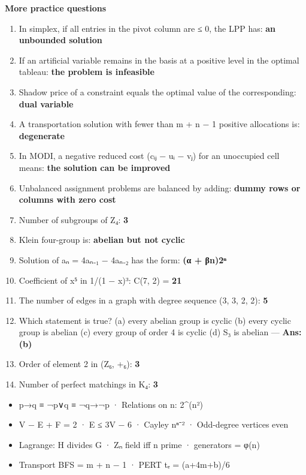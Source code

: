 \textbf{More practice questions}

\begin{enumerate}
\def\labelenumi{\arabic{enumi}.}
\setcounter{enumi}{46}
\tightlist
\item
  In simplex, if all entries in the pivot column are ≤ 0, the LPP has: \textbf{an unbounded solution}
\item
  If an artificial variable remains in the basis at a positive level in the optimal tableau: \textbf{the problem is infeasible}
\item
  Shadow price of a constraint equals the optimal value of the corresponding: \textbf{dual variable}
\item
  A transportation solution with fewer than m + n − 1 positive allocations is: \textbf{degenerate}
\item
  In MODI, a negative reduced cost (cᵢⱼ − uᵢ − vⱼ) for an unoccupied cell means: \textbf{the solution can be improved}
\item
  Unbalanced assignment problems are balanced by adding: \textbf{dummy rows or columns with zero cost}
\item
  Number of subgroups of Z₄: \textbf{3}
\item
  Klein four-group is: \textbf{abelian but not cyclic}
\item
  Solution of aₙ = 4aₙ₋₁ − 4aₙ₋₂ has the form: \textbf{(α + βn)2ⁿ}
\item
  Coefficient of x⁵ in 1/(1 − x)³: C(7, 2) = \textbf{21}
\item
  The number of edges in a graph with degree sequence (3, 3, 2, 2): \textbf{5}
\item
  Which statement is true? (a) every abelian group is cyclic (b) every cyclic group is abelian (c) every group of order 4 is cyclic (d) S₃ is abelian --- \textbf{Ans: (b)}
\item
  Order of element 2 in (Z₆, +₆): \textbf{3}
\item
  Number of perfect matchings in K₄: \textbf{3}
\end{enumerate}

\begin{revbox}

\begin{itemize}
\tightlist
\item
  p→q ≡ ¬p∨q ≡ ¬q→¬p · Relations on n: 2\^{}(n²)
\item
  V − E + F = 2 · E ≤ 3V − 6 · Cayley nⁿ⁻² · Odd-degree vertices even
\item
  Lagrange: \textbar H\textbar{} divides \textbar G\textbar{} · Zₙ field iff n prime · generators = φ(n)
\item
  Transport BFS = m + n − 1 · PERT tₑ = (a+4m+b)/6
\end{itemize}

\end{revbox}
